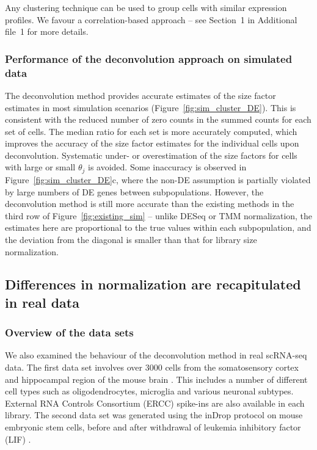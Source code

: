 \documentclass{bmcart}
\newcommand{\suppclustering}{1}
\begin{document}
Any clustering technique can be used to group cells with similar expression profiles.
We favour a correlation-based approach -- see Section~\suppclustering{} in Additional file~1 for more details.

\subsubsection*{Performance of the deconvolution approach on simulated data}
The deconvolution method provides accurate estimates of the size factor estimates in most simulation scenarios (Figure~\ref{fig:sim_cluster_DE}).
This is consistent with the reduced number of zero counts in the summed counts for each set of cells.
The median ratio for each set is more accurately computed, which improves the accuracy of the size factor estimates for the individual cells upon deconvolution.
Systematic under- or overestimation of the size factors for cells with large or small $\theta_j$ is avoided.
Some inaccuracy is observed in Figure~\ref{fig:sim_cluster_DE}c, where the non-DE assumption is partially violated by large numbers of DE genes between subpopulations.
However, the deconvolution method is still more accurate than the existing methods in the third row of Figure~\ref{fig:existing_sim}
    -- unlike DESeq or TMM normalization, the estimates here are proportional to the true values within each subpopulation, 
       and the deviation from the diagonal is smaller than that for library size normalization.

\subsection*{Differences in normalization are recapitulated in real data}

\subsubsection*{Overview of the data sets}
We also examined the behaviour of the deconvolution method in real scRNA-seq data.
The first data set involves over 3000 cells from the somatosensory cortex and hippocampal region of the mouse brain \cite{zeisel2015brain}.
This includes a number of different cell types such as oligodendrocytes, microglia and various neuronal subtypes.
External RNA Controls Consortium (ERCC) spike-ins are also available in each library.
The second data set was generated using the inDrop protocol on mouse embryonic stem cells, before and after withdrawal of leukemia inhibitory factor (LIF) \cite{klein2015droplet}.
\end{document}
